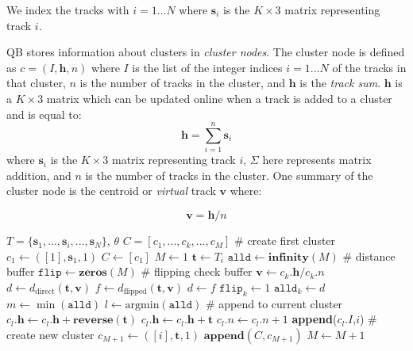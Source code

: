 \documentclass{bioinfo}
\begin{document}
\begin{methods}
We index the tracks with $i = 1 \dots N$ where $\mathbf{s}_{i}$ is the
$K\times3$ matrix representing track $i$.

QB stores information about clusters in \emph{cluster nodes}.  The
cluster node is defined as $c=(I,\mathbf{h},n)$ where $I$ is the list of
the integer indices $i = 1 \dots N$ of the tracks in that cluster, $n$
is the number of tracks in the cluster, and $\mathbf{h}$ is the \emph{track
  sum}. $\mathbf{h}$ is a $K \times3$ matrix which can be updated online
when a track is added to a cluster and is equal to:
\begin{equation}
  \mathbf{h}=\sum_{i=1}^{n}\mathbf{s}_{i}
\end{equation} 
where $\mathbf{s}_{i}$ is the $K\times3$ matrix representing track $i$,
$\Sigma$ here represents matrix addition, and $n$ is the number of
tracks in the cluster. One summary of the cluster node is the centroid or
\emph{virtual} track $\mathbf{v}$ where:

\begin{equation}
  \mathbf{v} = \mathbf{h} / n
\end{equation}

\begin{algorithm}
\begin{algorithmic}
\REQUIRE $T=\{\mathbf{s}_{1},...,\mathbf{s}_{i},...,\mathbf{s}_{N}\}$, $\theta$
\ENSURE $C=[c_{1},...,c_{k},...,c_{M}]$ 
\STATE \# create first cluster
\STATE $c_{1} \leftarrow ([1],\mathbf{s}_{1},1)$
\STATE $C\leftarrow[c_{1}]$
\STATE $M\leftarrow1$ 
	\STATE $\textbf{t}\leftarrow T_{i}$
	\STATE $\texttt{alld}\leftarrow\textbf{infinity}(M)$ \# distance buffer
	\STATE $\texttt{flip}\leftarrow\textbf{zeros}(M)$ \# flipping check buffer
		\STATE $\mathbf{v}\leftarrow c_{k}.\mathbf{h}/c_{k}.n$
		\STATE $d\leftarrow d_{\textrm{direct}}(\mathbf{t},\mathbf{v})$
		\STATE $f\leftarrow d_{\textrm{flipped}}(\mathbf{t},\mathbf{v})$
		\STATE $d \leftarrow f$
		\STATE $\texttt{flip}_{k} \leftarrow 1$
	\ENDIF
	\STATE $\texttt{alld}_{k} \leftarrow d$
	\ENDFOR
\STATE $m\leftarrow \min(\texttt{alld})$
\STATE $l\leftarrow \mathrm{arg min}(\texttt{alld})$
\STATE \# append to current cluster
		\STATE $c_{l}.\mathbf{h} \leftarrow c_{l}.\mathbf{h} + \textbf{reverse}(\textbf{t})$
	\ELSE
		\STATE $c_{l}.\mathbf{h} \leftarrow c_{l}.\mathbf{h} + \textbf{t}$
	\ENDIF
	\STATE $c_{l}.n \leftarrow c_{l}.n + 1$
	\STATE \textbf{append}($c_{l}.I$,$i$)
\ELSE 
\STATE \# create new cluster
        \STATE $c_{M+1} \leftarrow ([i],\mathbf{t},1)$
        \STATE $\mathbf{append}(C,c_{M+1})$
	\STATE $M\leftarrow M+1$
\ENDIF
\ENDFOR 
\end{algorithmic}


\end{algorithm}
\end{methods}
\end{document}
